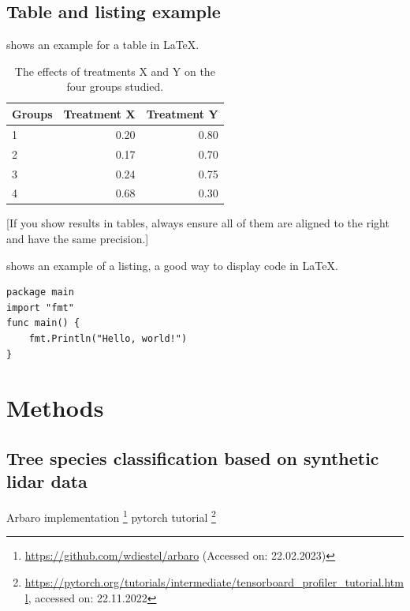 \documentclass[12pt, a4paper, hidelinks]{article}
\begin{document}
\subsection{Table and listing example}
 shows an example for a table in \LaTeX.
\begin{table}[th]
\label{tab:treatments}
\centering
\begin{tabularx}{0.45\textwidth}{l||r|r}
Groups & Treatment X & Treatment Y \\
\hline \hline
1 & 0.20 & 0.80\\
2 & 0.17 & 0.70\\
3 & 0.24 & 0.75\\
4 & 0.68 & 0.30\\
\end{tabularx}
\caption{The effects of treatments X and Y on the four groups studied.}
\end{table}

[If you show results in tables, always ensure all of them are aligned to the right and have the same precision.]

 shows an example of a listing, a good way to display code in \LaTeX.

\begin{listing}
\begin{verbatim}
package main
import "fmt"
func main() {
    fmt.Println("Hello, world!")
}
\end{verbatim}
\caption{"Hello, world!" in Go}
\label{lst:hello}
\end{listing}
\fi

\section{Methods}
\label{sec:methods}

\subsection{Tree species classification based on synthetic lidar data}
\label{sec:workflow}

\cite{white_2016_als-forest-inventory}
\cite{uba_2020_waldumbau}
\cite{weber_1995_arbaro}
Arbaro implementation \footnote{\url{https://github.com/wdiestel/arbaro} (Accessed on: 22.02.2023)}
\cite{pointnet}
\cite{verma_2019_metrics-ml-benchmarking}
pytorch tutorial \footnote{\url{https://pytorch.org/tutorials/intermediate/tensorboard_profiler_tutorial.html}, accessed on: 22.11.2022}
\end{document}
